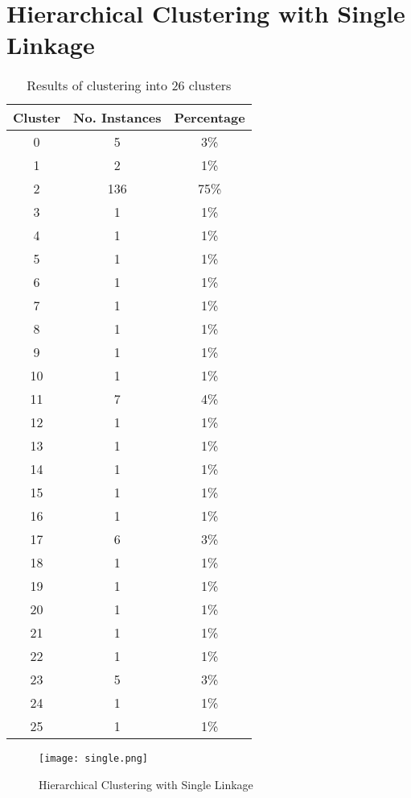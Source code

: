 \documentclass[
11pt, %
a4paper, %
oneside, %
headinclude,footinclude, %
BCOR5mm, %
]{scrartcl}
\begin{document}
\newpage
\section{Hierarchical Clustering with Single Linkage}
\begin{table}[h!]
	\centering
	\caption{Results of clustering into 26 clusters}
	\label{table:single}
	\begin{tabular}{||c c c||} 
		\hline
		Cluster & No. Instances & Percentage \\ [0.5ex] 
		\hline\hline
		0 & 5 &  3\% \\
		1 & 2 &  1\% \\
		2 & 136 & 75\% \\
		3 & 1 & 1\% \\
		4 & 1 & 1\% \\
		5 & 1 & 1\% \\
		6 & 1 & 1\% \\
		7 & 1 & 1\% \\
		8 & 1 & 1\% \\
		9 & 1 & 1\% \\
		10 & 1 & 1\% \\
		11 & 7 & 4\% \\
		12 & 1 & 1\% \\
		13 & 1 & 1\% \\
		14 & 1 & 1\% \\
		15 & 1 & 1\% \\
		16 & 1 & 1\% \\
		17 & 6 & 3\% \\
		18 & 1 & 1\% \\
		19 & 1 & 1\% \\
		20 & 1 & 1\% \\
		21 & 1 & 1\% \\
		22 & 1 & 1\% \\
		23 & 5 & 3\% \\
		24 & 1 & 1\% \\
		25 & 1 & 1\%\\ [1ex] 
		\hline
	\end{tabular}
\end{table}
\newpage
\begin{figure}[h]
	\centering
	\texttt{[image: single.png]}
	\caption{Hierarchical Clustering with Single Linkage}
	\label{figure:single}
\end{figure}
\end{document}
